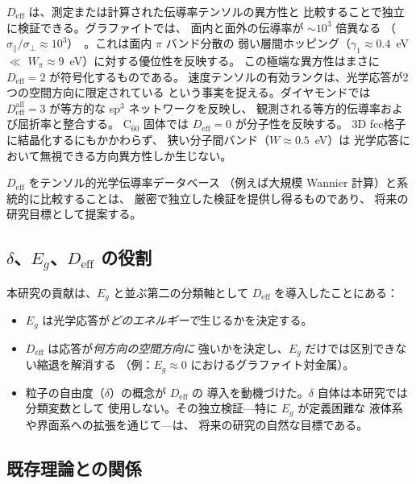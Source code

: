 \documentclass[twocolumn,showpacs,preprintnumbers,amsmath,amssymb,prb]{revtex4-2}
\begin{document}
$D_\mathrm{eff}$ は、測定または計算された伝導率テンソルの異方性と
比較することで独立に検証できる。グラファイトでは、
面内と面外の伝導率が $\sim$$10^3$ 倍異なる
（$\sigma_\parallel / \sigma_\perp \approx
10^3$）~\cite{Spain1981}。これは面内 $\pi$ バンド分散の
弱い層間ホッピング（$\gamma_1 \approx 0.4$~eV $\ll$
$W_\pi \approx 9$~eV）に対する優位性を反映する。
この極端な異方性はまさに $D_\mathrm{eff} = 2$ が符号化するものである。
速度テンソルの有効ランクは、光学応答が2つの空間方向に限定されている
という事実を捉える。ダイヤモンドでは
$D_\mathrm{eff}^\mathrm{all} = 3$ が等方的な sp$^3$ ネットワークを反映し、
観測される等方的伝導率および屈折率と整合する。
C$_{60}$ 固体では $D_\mathrm{eff} = 0$ が分子性を反映する。
3D fcc格子に結晶化するにもかかわらず、
狭い分子間バンド（$W \approx 0.5$~eV）は
光学応答において無視できる方向異方性しか生じない。

$D_\mathrm{eff}$ をテンソル的光学伝導率データベース
（例えば大規模 Wannier 計算）と系統的に比較することは、
厳密で独立した検証を提供し得るものであり、
将来の研究目標として提案する。

\subsection{$\delta$、$E_g$、$D_\mathrm{eff}$ の役割}

本研究の貢献は、$E_g$ と並ぶ第二の分類軸として
$D_\mathrm{eff}$ を導入したことにある：
\begin{itemize}
  \item $E_g$ は光学応答が\emph{どのエネルギーで}生じるかを決定する。
  \item $D_\mathrm{eff}$ は応答が\emph{何方向の空間方向に}
    強いかを決定し、$E_g$ だけでは区別できない縮退を解消する
    （例：$E_g \approx 0$ におけるグラファイト対金属）。
  \item 粒子の自由度（$\delta$）の概念が $D_\mathrm{eff}$ の
    導入を動機づけた。$\delta$ 自体は本研究では分類変数として
    使用しない。その独立検証---特に $E_g$ が定義困難な
    液体系や界面系への拡張を通じて---は、
    将来の研究の自然な目標である。
\end{itemize}

\subsection{既存理論との関係}
\end{document}
